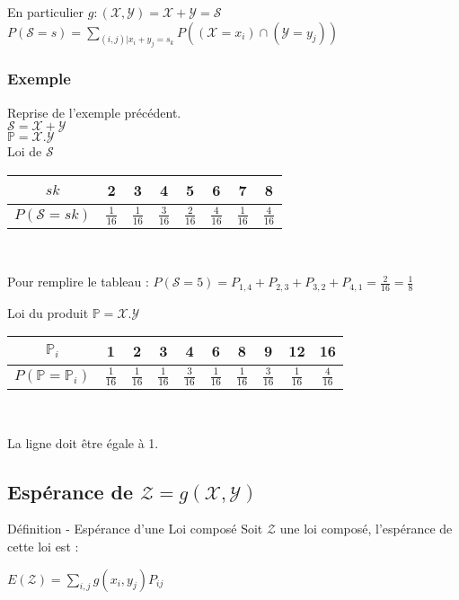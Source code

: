 \documentclass[a4paper, 12pt]{article}
\begin{document}
\begin{flushleft}
En particulier $g: (\mathcal{X, Y}) = \mathcal{X} + \mathcal{Y} = \mathcal{S}$\\
$P (\mathcal{S} = s) = \underset{(i, j) | x_i + y_j = s_k}{\sum} P ((\mathcal{X} = x_i) \cap (\mathcal{Y} = y_j))$
\end{flushleft}



\subsubsection*{Exemple}
Reprise de l'exemple précédent.\\
$\mathcal{S = X + Y}$\\
$\mathbb{P} = \mathcal{X . Y}$\\
Loi de $\mathcal{S}$

{\Large
\begin{center}
\begin{tabular}{c|ccccccc}
	$sk$ & 2 & 3 & 4 & 5 & 6 & 7 & 8 \\
	\hline
	$P (\mathcal{S} = sk)$ & $\frac{1}{16}$ & $\frac{1}{16}$ & $\frac{3}{16}$ & $\frac{2}{16}$ &  $\frac{4}{16}$ & $\frac{1}{16}$ & $\frac{4}{16}$ \\
\end{tabular}\\
\end{center}
}

Pour remplire le tableau : $P (\mathcal{S} = 5) = P_{1, 4} + P_{2, 3} + P_{3, 2} + P_{4, 1} = \frac{2}{16} = \frac{1}{8}$

Loi du produit $\mathbb{P} = \mathcal{X . Y}$

{\Large
\begin{center}
\begin{tabular}{c|ccccccccc}
	$\mathbb{P}_i$ & 1 & 2 & 3 & 4 & 6 & 8 & 9 & 12 & 16 \\
	\hline
	$P (\mathbb{P} = \mathbb{P}_i)$ & $\frac{1}{16}$ & $\frac{1}{16}$ & $\frac{1}{16}$ & $\frac{3}{16}$ & $\frac{1}{16}$ & $\frac{1}{16}$ & $\frac{3}{16}$ & $\frac{1}{16}$ & $\frac{4}{16}$ \\
\end{tabular}\\
\end{center}
}

La ligne doit être égale à 1.



\subsection{Espérance de $\mathcal{Z} = g(\mathcal{X, Y})$}
\begin{definition}{Définition - Espérance d'une Loi composé}
Soit $\mathcal{Z}$ une loi composé, l'espérance de cette loi est :
\begin{center}
$\boxed{E(\mathcal{Z}) = \underset{i, j}{\sum} g(x_i, y_j) P_{ij}}$
\end{center}
\end{definition}
\end{document}
